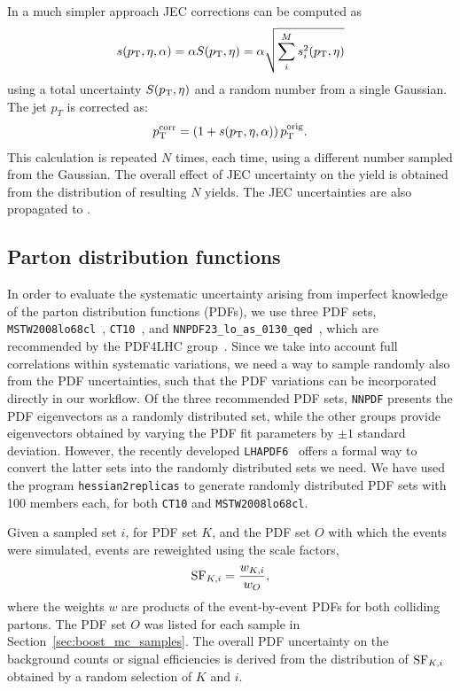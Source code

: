 In a much simpler approach JEC corrections can be computed as
\begin{equation}
s(p_{\mathrm{T}}, \eta, \alpha) = \alpha S (p_{\mathrm{T}}, \eta) = \alpha \sqrt {\sum_i^M s_i^2 (p_{\mathrm{T}}, \eta) }
\end{equation}
using a total uncertainty $S (p_{\mathrm{T}}, \eta)$ and a random number from a single Gaussian.  
The jet $p_T$ is corrected as:
\begin{equation}
p_{\mathrm{T}}^{\rm corr} = \left(1 + s(p_{\mathrm{T}}, \eta, \alpha)\right) p_{\mathrm{T}}^{\rm orig}.
\end{equation}
This calculation is repeated $N$ times, each time, using a different number sampled from the
Gaussian.  
The overall effect of JEC uncertainty on the yield is obtained from the distribution of resulting
$N$ yields.  
The JEC uncertainties are also propagated to \ETm .


\subsection{Parton distribution functions} 

In order to evaluate the systematic uncertainty arising from imperfect knowledge of the parton
distribution functions (PDFs), we use three PDF sets, {\tt MSTW2008lo68cl}~\cite{Martin:2009iq},
{\tt CT10}~\cite{Lai:2010vv}, and {\tt NNPDF23\_lo\_as\_0130\_qed}~\cite{nnpdf}, which are
recommended by the PDF4LHC group~\cite{Alekhin:2011sk,Botje:2011sn}.  
Since we take into account full correlations within systematic variations, we need a way to sample
randomly also from the PDF uncertainties, such that the PDF variations can be incorporated directly
in our workflow. 
Of the three recommended PDF sets, {\tt NNPDF} presents the PDF eigenvectors as a randomly
distributed set, while the other groups provide eigenvectors obtained by varying the PDF fit
parameters by $\pm 1$ standard deviation.  
However, the recently developed {\tt LHAPDF6}~\cite{LHAPDF6} offers a formal way to convert the
latter sets into the randomly distributed sets we need.  
We have used the program {\tt hessian2replicas} to generate randomly
distributed PDF sets with 100 members each, for both {\tt CT10} and {\tt MSTW2008lo68cl}.  

Given a sampled set $i$, for PDF set $K$, and the PDF set $O$ with which the events were simulated,
events are reweighted using the scale factors, 
\begin{equation}
{\rm SF}_{K, i} = \frac{w_{K, i}}{w_{O}},
\end{equation}
where the weights $w$ are products of the event-by-event PDFs for both colliding partons.
The PDF set $O$ was listed for each sample in Section~\ref{sec:boost_mc_samples}.
The overall PDF uncertainty on the background counts or signal efficiencies is derived
from the distribution of ${\rm SF}_{K, i}$ obtained by a random selection of $K$ and $i$.  

